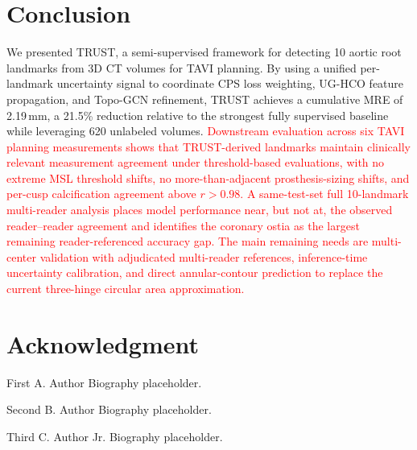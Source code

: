 \documentclass[conference]{IEEEtran}
\begin{document}
\section{Conclusion}
\label{sec:conclusion}

We presented TRUST, a semi-supervised framework for detecting 10 aortic root landmarks from 3D CT volumes for TAVI planning. By using a unified per-landmark uncertainty signal to coordinate CPS loss weighting, UG-HCO feature propagation, and Topo-GCN refinement, TRUST achieves a cumulative MRE of 2.19\,mm, a 21.5\% reduction relative to the strongest fully supervised baseline while leveraging 620 unlabeled volumes. \textcolor{red}{Downstream evaluation across six TAVI planning measurements shows that TRUST-derived landmarks maintain clinically relevant measurement agreement under threshold-based evaluations, with no extreme MSL threshold shifts, no more-than-adjacent prosthesis-sizing shifts, and per-cusp calcification agreement above $r > 0.98$.} \textcolor{red}{A same-test-set full 10-landmark multi-reader analysis places model performance near, but not at, the observed reader--reader agreement and identifies the coronary ostia as the largest remaining reader-referenced accuracy gap. The main remaining needs are multi-center validation with adjudicated multi-reader references, inference-time uncertainty calibration, and direct annular-contour prediction to replace the current three-hinge circular area approximation.}

\section*{Acknowledgment}




\begin{IEEEbiographynophoto}{First A. Author}
Biography placeholder.
\end{IEEEbiographynophoto}

\begin{IEEEbiographynophoto}{Second B. Author}
Biography placeholder.
\end{IEEEbiographynophoto}

\begin{IEEEbiographynophoto}{Third C. Author Jr.}
Biography placeholder.
\end{IEEEbiographynophoto}
\end{document}
